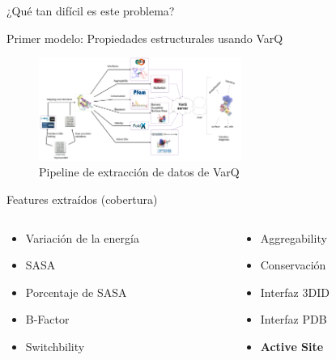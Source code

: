 \documentclass[
  spanish,
  ignorenonframetext,
]{beamer}
\providecommand{\tightlist}{%
  \setlength{\itemsep}{0pt}\setlength{\parskip}{0pt}}
\begin{document}
\begin{frame}{}
\protect\hypertarget{section}{}

\begin{center}
\Huge ¿Qué tan difícil es este problema?
\end{center}

\end{frame}

\begin{frame}{Primer modelo: Propiedades estructurales usando VarQ}
\protect\hypertarget{primer-modelo-propiedades-estructurales-usando-varq}{}

\begin{figure}
\centering
\includegraphics[width=2.60417in,height=\textheight]{varQ_Pipeline.png}
\caption{Pipeline de extracción de datos de VarQ}
\end{figure}

\begin{block}{Features extraídos (cobertura)}

\begin{columns}[T]
\begin{column}{0.48\textwidth}
\begin{itemize}
\tightlist
\item
  Variación de la energía
\item
  SASA
\item
  Porcentaje de SASA
\item
  B-Factor
\item
  Switchbility
\end{itemize}
\end{column}

\begin{column}{0.48\textwidth}
\begin{itemize}
\tightlist
\item
  Aggregability
\item
  Conservación
\item
  Interfaz 3DID
\item
  Interfaz PDB
\item
  \textbf{Active Site}
\end{itemize}
\end{column}
\end{columns}

\end{block}

\end{frame}
\end{document}
